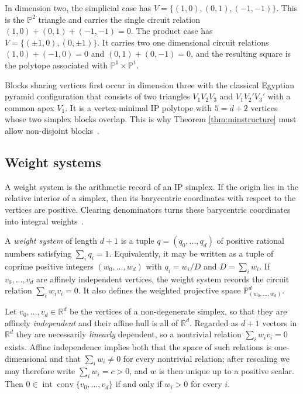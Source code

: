 \documentclass[appliedmath,article,submit,moreauthors]{Definitions/mdpi}
\newcommand{\RR}{\mathbb{R}}
\newcommand{\interior}{\operatorname{int}}
\newcommand{\Conv}{\operatorname{conv}}
\begin{document}
\begin{Example}
\label{ex:minexamples}
In dimension two, the simplicial case has $V=\{(1,0),(0,1),(-1,-1)\}$. This is
the \(\mathbb{P}^2\) triangle and carries the single circuit relation
$(1,0)+(0,1)+(-1,-1)=0$. The product case has $V=\{(\pm 1,0),(0,\pm 1)\}$. It
carries two one dimensional circuit relations $(1,0)+(-1,0)=0$ and
$(0,1)+(0,-1)=0$, and the resulting square is the polytope associated with
\(\mathbb{P}^1\times\mathbb{P}^1\).
\end{Example}

Blocks sharing vertices first occur in dimension three with the classical
Egyptian pyramid configuration that consists of two triangles \(V_1V_2V_3\) and
\(V_1V_2'V_3'\) with a common apex \(V_1\). It is a vertex-minimal IP polytope
with \(5=d+2\) vertices whose two simplex blocks overlap.  This is why Theorem
\ref{thm:minstructure} must allow non-disjoint blocks~\cite{KS97}.

\subsection{Weight systems}
\label{sec:math-weights}

A weight system is the arithmetic record of an IP simplex.  If the origin lies
in the relative interior of a simplex, then its barycentric coordinates with
respect to the vertices are positive.  Clearing denominators turns these
barycentric coordinates into integral weights~\cite{Skarke1996,Conrads2002}.

\begin{Definition}
\label{def:weights}
A \emph{weight system} of length \(d+1\) is a tuple \(q=(q_0,\ldots,q_d)\) of
positive rational numbers satisfying \(\sum_i q_i=1\). Equivalently, it may be
written as a tuple of coprime positive integers \((w_0,\ldots,w_d)\) with
\(q_i=w_i/D\) and \(D=\sum_i w_i\). If \(v_0,\ldots,v_d\) are affinely
independent vertices, the weight system records the circuit relation \(\sum_i
w_i v_i=0\). It also defines the weighted projective space
\(\mathbb{P}^d_{(w_0,\ldots,w_d)}\).
\end{Definition}

\begin{Lemma}
\label{lem:ipcrit}
{\color{blue}Let \(v_0,\ldots,v_d\in\RR^d\) be the vertices of a non-degenerate
simplex, so that they are affinely \emph{independent} and their affine hull is
all of \(\RR^d\). Regarded as \(d+1\) vectors in \(\RR^d\) they are necessarily
\emph{linearly} dependent, so a nontrivial relation \(\sum_i w_iv_i=0\) exists.
Affine independence implies both that the space of such relations is
one-dimensional and that \(\sum_iw_i\neq0\) for every nontrivial relation;
after rescaling we may therefore write \(\sum_iw_i=c>0\), and \(w\) is then
unique up to a positive scalar.} Then
\(0\in\interior\Conv\{v_0,\ldots,v_d\}\) if and only if \(w_i>0\) for every
\(i\).
\end{Lemma}
\end{document}
